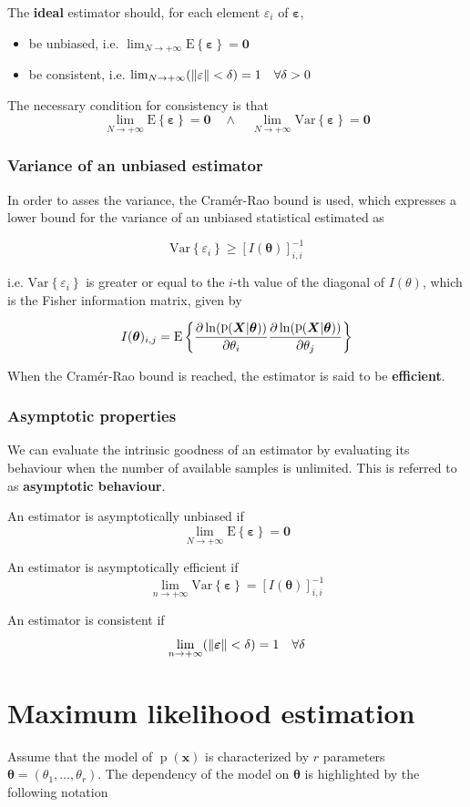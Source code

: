\documentclass[oneside,onecolumn]{report}
\newcommand{\E}[1]{\text{E} \left\{ #1 \right\}}
\newcommand{\Var}[1]{\text{Var} \left\{ #1 \right\}}
\newcommand{\eps}{\varepsilon}
\DeclareMathOperator*{\pdf}{p}
\let\P\relax
\DeclareMathOperator*{\P}{P}
\begin{document}
The \textbf{ideal} estimator should, for each element $\eps_i$ of $\bm \eps$,
\begin{itemize}
    \item be unbiased, i.e. $\lim_{N \to +\infty} \E{\bm \eps} = \bm 0$
    \item be consistent, i.e. $\lim_{N \to +\infty} \P(\norm{\eps} < \delta) = 1 \quad \forall \delta > 0$
\end{itemize}
The necessary condition for consistency is that
$$ \lim_{N \to +\infty} \E{\bm \eps} = \bm 0 \quad \wedge \quad \lim_{N \to +\infty} \Var{\bm \eps} = \bm 0 $$

\subsubsection{Variance of an unbiased estimator}
In order to asses the variance, the Cramér-Rao bound is used, which expresses a lower bound for the variance of an unbiased statistical estimated as

$$ \Var{\eps_i} \geq [I(\bm\theta)]_{i, i}^{-1} $$

i.e. $\Var{\eps_i}$ is greater or equal to the $i$-th value of the diagonal of $I(\theta)$, which is the Fisher information matrix, given by

$$ I(\bm \theta)_{i, j} = \E{
\pdv{\ln(\pdf(\bm X | \bm \theta))}{\theta_i}
\pdv{\ln(\pdf(\bm X | \bm \theta))}{\theta_j}
} $$

When the Cramér-Rao bound is reached, the estimator is said to be \textbf{efficient}.

\subsubsection{Asymptotic properties}
We can evaluate the intrinsic goodness of an estimator by evaluating its behaviour when the number of available samples is unlimited.
This is referred to as \textbf{asymptotic behaviour}.

An estimator is asymptotically unbiased if
$$ \lim_{N \to +\infty} \E{\bm \eps} = \bm 0 $$

An estimator is asymptotically efficient  if
$$ \lim_{n \to +\infty} \Var{\bm \eps} = [I(\bm\theta)]_{i, i}^{-1} $$

An estimator is consistent if
$$ \lim_{n \to +\infty} \P(\norm{\bm \varepsilon} < \delta) = 1 \quad \forall \delta $$




\section{Maximum likelihood estimation}
Assume that the model of $\pdf(\bm x)$ is characterized by $r$ parameters $\bm \theta = (\theta_1, \ldots, \theta_r)$.
The dependency of the model on $\bm \theta$ is highlighted by the following notation
\end{document}
